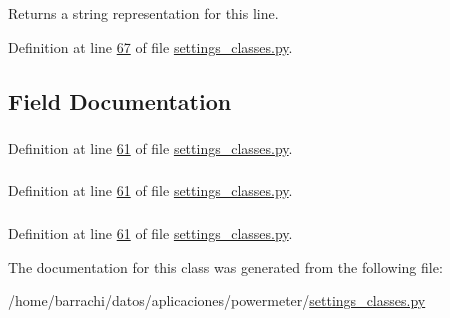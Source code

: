 \-Returns a string representation for this line. 



\-Definition at line \hyperlink{settings__classes_8py_source_l00067}{67} of file \hyperlink{settings__classes_8py_source}{settings\-\_\-classes.\-py}.



\subsection{\-Field \-Documentation}
\hypertarget{classsettings__classes_1_1_line_a2661f439a4a94ffdcd5e47ae1da0bb1d}{
\subsubsection[{description}]{}}\label{classsettings__classes_1_1_line_a2661f439a4a94ffdcd5e47ae1da0bb1d}


\-Definition at line \hyperlink{settings__classes_8py_source_l00061}{61} of file \hyperlink{settings__classes_8py_source}{settings\-\_\-classes.\-py}.

\hypertarget{classsettings__classes_1_1_line_ab74e6bf80237ddc4109968cedc58c151}{
\subsubsection[{name}]{}}\label{classsettings__classes_1_1_line_ab74e6bf80237ddc4109968cedc58c151}


\-Definition at line \hyperlink{settings__classes_8py_source_l00061}{61} of file \hyperlink{settings__classes_8py_source}{settings\-\_\-classes.\-py}.

\hypertarget{classsettings__classes_1_1_line_aa1a8261d8fb901476651f1666f993d4b}{
\subsubsection[{voltage}]{}}\label{classsettings__classes_1_1_line_aa1a8261d8fb901476651f1666f993d4b}


\-Definition at line \hyperlink{settings__classes_8py_source_l00061}{61} of file \hyperlink{settings__classes_8py_source}{settings\-\_\-classes.\-py}.



\-The documentation for this class was generated from the following file\-:\begin{DoxyCompactItemize}
\item 
/home/barrachi/datos/aplicaciones/powermeter/\hyperlink{settings__classes_8py}{settings\-\_\-classes.\-py}\end{DoxyCompactItemize}
